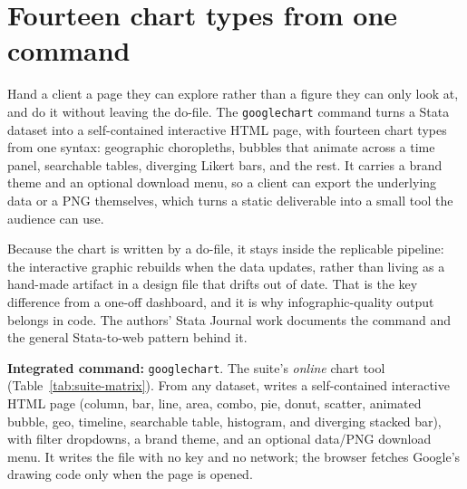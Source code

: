 \documentclass[
    a4paper,
    fontsize=10pt,
    twoside=true,
    numbers=noenddot,
]{kaobook}
\begin{document}
\section{Fourteen chart types from one command}
Hand a client a page they can explore rather than a figure they can only look at, and do it without leaving the do-file. The \texttt{googlechart} command turns a Stata dataset into a self-contained interactive HTML page, with fourteen chart types from one syntax: geographic choropleths, bubbles that animate across a time panel, searchable tables, diverging Likert bars, and the rest. It carries a brand theme and an optional download menu, so a client can export the underlying data or a PNG themselves, which turns a static deliverable into a small tool the audience can use.

Because the chart is written by a do-file, it stays inside the replicable pipeline: the interactive graphic rebuilds when the data updates, rather than living as a hand-made artifact in a design file that drifts out of date. That is the key difference from a one-off dashboard, and it is why infographic-quality output belongs in code. The authors' Stata Journal work documents the command and the general Stata-to-web pattern behind it.

\begin{kaobox}[frametitle=Package Integration: \texttt{googlechart}]
\textbf{Integrated command:} \texttt{googlechart}. The suite's \emph{online} chart tool (Table~\ref{tab:suite-matrix}). From any dataset, writes a self-contained interactive HTML page (column, bar, line, area, combo, pie, donut, scatter, animated bubble, geo, timeline, searchable table, histogram, and diverging stacked bar), with filter dropdowns, a brand theme, and an optional data/PNG download menu. It writes the file with no key and no network; the browser fetches Google's drawing code only when the page is opened.
\end{kaobox}
\end{document}
